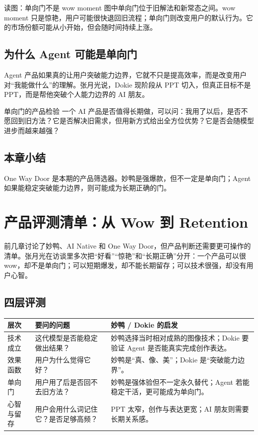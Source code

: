 \documentclass[a4paper]{article}
\begin{document}
\begin{knowledgebox}{读图：单向门不是 wow moment}
图中单向门位于旧解法和新常态之间。wow moment 只是惊艳，用户可能很快退回旧流程；单向门则改变用户的默认行为。它的市场份额可能从小开始，但会随时间持续上涨。
\end{knowledgebox}

\subsection{为什么 Agent 可能是单向门}

Agent 产品如果真的让用户突破能力边界，它就不只是提高效率，而是改变用户对“我能做什么”的理解。张月光说，Dokie 现阶段从 PPT 切入，但真正目标不是 PPT，而是帮他突破个人能力边界的 AI 朋友。

\begin{importantbox}{单向门的产品检验}
一个 AI 产品是否值得长期做，可以问：我用了以后，是否不愿回到旧方法？它是否解决旧需求，但用新方式给出全方位优势？它是否会随模型进步而越来越强？
\end{importantbox}

\subsection{本章小结}

One Way Door 是本期的产品筛选器。妙鸭是强爆款，但不一定是单向门；Agent 如果能稳定突破能力边界，则可能成为长期正确的门。

\section{产品评测清单：从 Wow 到 Retention}

前几章讨论了妙鸭、AI Native 和 One Way Door，但产品判断还需要更可操作的清单。张月光在访谈里多次把“好看”“惊艳”和“长期正确”分开：一个产品可以很 wow，却不是单向门；可以短期爆发，却不能长期留存；可以技术很强，却没有用户心智。

\subsection{四层评测}

\begin{longtable}{p{}p{}p{}}
\toprule
层次 & 要问的问题 & 妙鸭 / Dokie 的启发 \\
\midrule
技术成立 & 这代模型是否能稳定做出结果？ & 妙鸭选择当时相对成熟的图像技术；Dokie 要验证 Agent 是否能真实完成创作表达。 \\
效果函数 & 用户为什么觉得它好？ & 妙鸭是“真、像、美”；Dokie 是“突破能力边界”。 \\
单向门 & 用户用了后是否回不去旧方法？ & 妙鸭是强体验但不一定永久替代；Agent 若能稳定干活，更可能成为单向门。 \\
心智与留存 & 用户会用什么词记住它？是否足够高频？ & PPT 太窄，创作与表达更宽；AI 朋友则需要长期关系感。 \\
\bottomrule
\end{longtable}
\end{document}

